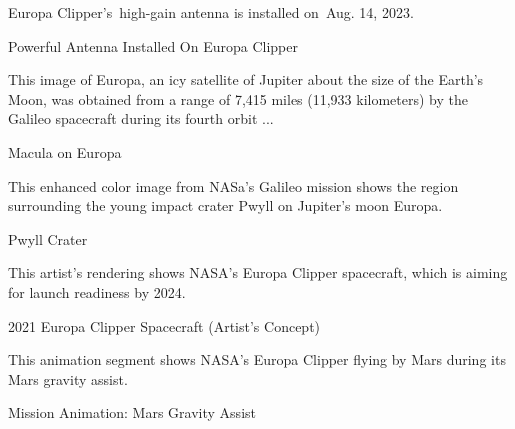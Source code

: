\documentclass[a4paper,11pt]{article}
\begin{document}
\begin{docenv}
{Europa Clipper's high-gain antenna is installed on Aug. 14, 2023.

Powerful Antenna Installed On Europa Clipper

This image of Europa, an icy satellite of Jupiter about the size of the Earth's Moon, was obtained from a range of 7,415 miles (11,933 kilometers) by the Galileo spacecraft during its fourth orbit ...

Macula on Europa 

This enhanced color image from NASa's Galileo mission shows the region surrounding the young impact crater Pwyll on Jupiter's moon Europa.

Pwyll Crater

This artist's rendering shows NASA's Europa Clipper spacecraft, which is aiming for launch readiness by 2024.

2021 Europa Clipper Spacecraft (Artist's Concept)

This animation segment shows NASA’s Europa Clipper flying by Mars during its Mars gravity assist. 

Mission Animation: Mars Gravity Assist}
\end{docenv}
\end{document}
